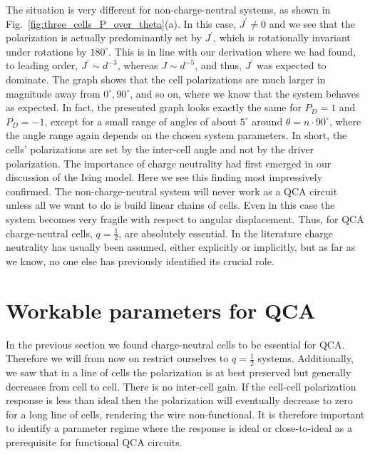 The situation is very different for non-charge-neutral systems, as shown in
Fig.~\ref{fig:three_cells_P_over_theta}(a). In this case, $J^{\prime} \ne 0$ and
we see that the polarization is actually predominantly set by $J^{\prime}$,
which is rotationally invariant under rotations by $180^{\circ}$. This is in
line with our derivation where we had found, to leading order, $J^{\prime} \sim
d^{-3}$, whereas $J \sim d^{-5}$, and thus, $J^{\prime}$ was expected to
dominate. The graph shows that the cell polarizations are much larger in
magnitude away from $0^{\circ}, 90^{\circ}$, and so on, where we know that the
system behaves as expected. In fact, the presented graph looks exactly the same
for $P_D = 1$ and $P_D = -1$, except for a small range of angles of about
$5^{\circ}$ around $\theta = n \cdot 90^{\circ}$, where the angle range again
depends on the chosen system parameters. In short, the cells' polarizations are
set by the inter-cell angle and not by the driver polarization. The importance
of charge neutrality had first emerged in our discussion of the Ising model.
Here we see this finding most impressively confirmed. The non-charge-neutral
system will never work as a QCA circuit unless all we want to do is build linear
chains of cells. Even in this case the system becomes very fragile with respect
to angular displacement. Thus, for QCA charge-neutral cells, $q=\frac{1}{2}$,
are absolutely essential. In the literature charge neutrality has usually been
assumed, either explicitly or implicitly, but as far as we know, no one else has
previously identified its crucial role.


\section{Workable parameters for QCA}

In the previous section we found charge-neutral cells to be essential for QCA.
Therefore we will from now on restrict ourselves to $q=\frac{1}{2}$ systems.
Additionally, we saw that in a line of cells the polarization is at best
preserved but generally decreases from cell to cell. There is no inter-cell
gain. If the cell-cell polarization response is less than ideal then the
polarization will eventually decrease to zero for a long line of cells,
rendering the wire non-functional. It is therefore important to identify a
parameter regime where the response is ideal or close-to-ideal as a prerequisite
for functional QCA circuits.

